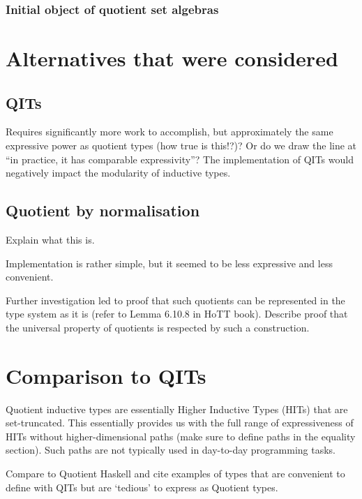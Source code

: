 \documentclass[11pt]{article}
\begin{document}
\subsubsection{Initial object of quotient set algebras}

\section{Alternatives that were considered}
\subsection{QITs}
Requires significantly more work to accomplish, but approximately the same expressive power as quotient types (how true is this!?)? Or do we draw the line at ``in practice, it has comparable expressivity''?
The implementation of QITs would negatively impact the modularity of inductive types.

\subsection{Quotient by normalisation}
Explain what this is.

Implementation is rather simple, but it seemed to be less expressive and less convenient.

Further investigation led to proof that such quotients can be represented in the type system as it is (refer to Lemma 6.10.8 in HoTT book). Describe proof that the universal property of quotients is respected by such a construction.

\section{Comparison to QITs}
Quotient inductive types are essentially Higher Inductive Types (HITs) that are set-truncated. This essentially provides us with the full range of expressiveness of HITs without higher-dimensional paths (make sure to define paths in the equality section). Such paths are not typically used in day-to-day programming tasks.

Compare to Quotient Haskell and cite examples of types that are convenient to define with QITs but are `tedious' to express as Quotient types.
\end{document}
